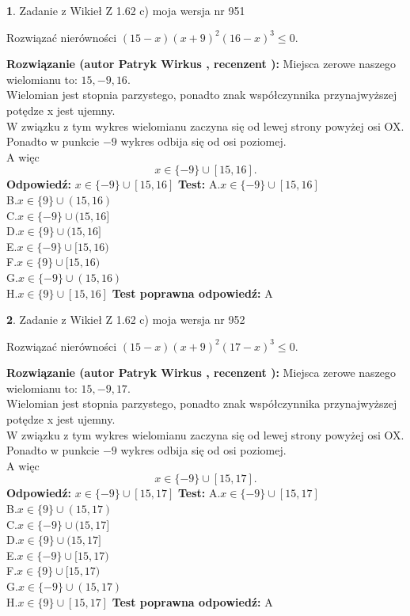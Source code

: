\documentclass[12pt, a4paper]{article}
\theoremstyle{definition} %
\newtheorem{zad}{}
\newcommand{\zadStart}[1]{\begin{zad}#1\newline}
\newcommand{\zadStop}{\end{zad}}
\newcommand{\rozwStart}[2]{\noindent \textbf{Rozwiązanie (autor #1 , recenzent #2): }\newline}
\newcommand{\rozwStop}{\newline}
\newcommand{\odpStart}{\noindent \textbf{Odpowiedź:}\newline}
\newcommand{\odpStop}{\newline}
\newcommand{\testStart}{\noindent \textbf{Test:}\newline}
\newcommand{\testStop}{\newline}
\newcommand{\kluczStart}{\noindent \textbf{Test poprawna odpowiedź:}\newline}
\newcommand{\kluczStop}{\newline}
\begin{document}
\zadStart{Zadanie z Wikieł Z 1.62 c) moja wersja nr 951}

Rozwiązać nierówności $(15-x)(x+9)^{2}(16-x)^{3}\le0$.
\zadStop
\rozwStart{Patryk Wirkus}{}
Miejsca zerowe naszego wielomianu to: $15, -9, 16$.\\
Wielomian jest stopnia parzystego, ponadto znak współczynnika przy\linebreak najwyższej potędze x jest ujemny.\\ W związku z tym wykres wielomianu zaczyna się od lewej strony powyżej osi OX.\\
Ponadto w punkcie $-9$ wykres odbija się od osi poziomej.\\
A więc $$x \in \{-9\} \cup [15,16].$$
\rozwStop
\odpStart
$x \in \{-9\} \cup [15,16]$
\odpStop
\testStart
A.$x \in \{-9\} \cup [15,16]$\\
B.$x \in \{9\} \cup (15,16)$\\
C.$x \in \{-9\} \cup (15,16]$\\
D.$x \in \{9\} \cup (15,16]$\\
E.$x \in \{-9\} \cup [15,16)$\\
F.$x \in \{9\} \cup [15,16)$\\
G.$x \in \{-9\} \cup (15,16)$\\
H.$x \in \{9\} \cup [15,16]$
\testStop
\kluczStart
A
\kluczStop



\zadStart{Zadanie z Wikieł Z 1.62 c) moja wersja nr 952}

Rozwiązać nierówności $(15-x)(x+9)^{2}(17-x)^{3}\le0$.
\zadStop
\rozwStart{Patryk Wirkus}{}
Miejsca zerowe naszego wielomianu to: $15, -9, 17$.\\
Wielomian jest stopnia parzystego, ponadto znak współczynnika przy\linebreak najwyższej potędze x jest ujemny.\\ W związku z tym wykres wielomianu zaczyna się od lewej strony powyżej osi OX.\\
Ponadto w punkcie $-9$ wykres odbija się od osi poziomej.\\
A więc $$x \in \{-9\} \cup [15,17].$$
\rozwStop
\odpStart
$x \in \{-9\} \cup [15,17]$
\odpStop
\testStart
A.$x \in \{-9\} \cup [15,17]$\\
B.$x \in \{9\} \cup (15,17)$\\
C.$x \in \{-9\} \cup (15,17]$\\
D.$x \in \{9\} \cup (15,17]$\\
E.$x \in \{-9\} \cup [15,17)$\\
F.$x \in \{9\} \cup [15,17)$\\
G.$x \in \{-9\} \cup (15,17)$\\
H.$x \in \{9\} \cup [15,17]$
\testStop
\kluczStart
A
\kluczStop
\end{document}
